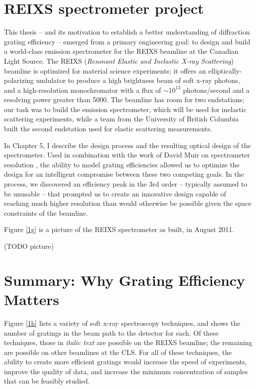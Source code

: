 \section{REIXS spectrometer project}
This thesis -- and its motivation to establish a better understanding of diffraction grating efficiency -- emerged from a primary engineering goal: to design and build a world-class emission spectrometer for the REIXS beamline at the Canadian Light Source.  The REIXS (\emph{Resonant Elastic and Inelastic X-ray Scattering}) beamline is optimized for material science experiments; it offers an elliptically-polarizing undulator to produce a high brightness beam of soft x-ray photons, and a high-resolution monochromator with a flux of $\sim10^{13}$ photons/second and a resolving power greater than 5000.  The beamline has room for two endstations; our task was to build the emission spectrometer, which will be used for inelastic scattering experiments, while a team from the University of British Columbia built the second endstation used for elastic scattering measurements.

In Chapter 5, I describe the design process and the resulting optical design of the spectrometer.  Used in combination with the work of David Muir on spectrometer resolution \cite{Mui06}, the ability to model grating efficiencies allowed us to optimize the design for an intelligent compromise between these two competing goals.  In the process, we discovered an efficiency peak in the 3rd order -- typically assumed to be unusable -- that prompted us to create an innovative design capable of reaching much higher resolution than would otherwise be possible given the space constraints of the beamline.

Figure \ref{1g} is a picture of the REIXS spectrometer as built, in August 2011.

(TODO picture)

 \section{Summary: Why Grating Efficiency Matters}
 Figure \ref{1h} lists a variety of soft x-ray spectroscopy techniques, and shows the number of gratings in the beam path to the detector for each.  Of these techniques, those in \emph{italic text} are possible on the REIXS beamline; the remaining are possible on other beamlines at the CLS.  For all of these techniques, the ability to create more efficient gratings would increase the speed of experiments, improve the quality of data, and increase the minimum concentration of samples that can be feasibly studied.
 
